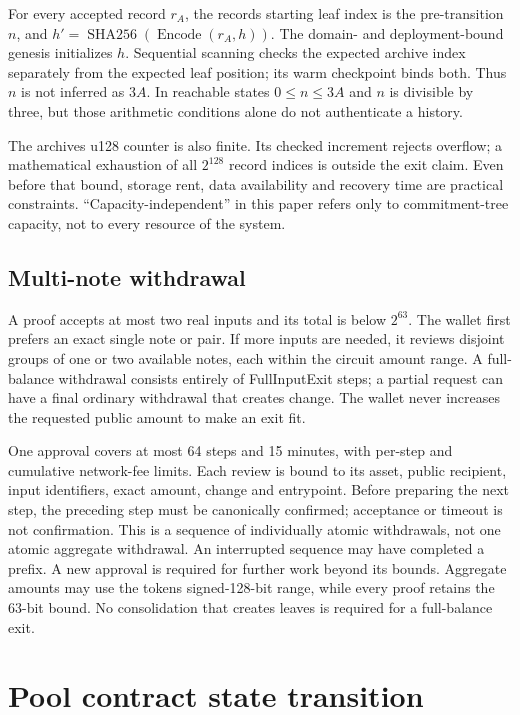 \documentclass[11pt,letterpaper]{article}
\begin{document}
For every accepted record \(r_A\), the record\textquotesingle s starting
leaf index is the pre-transition \(n\), and
\(h'=\operatorname{SHA256}(\operatorname{Encode}(r_A,h))\). The domain-
and deployment-bound genesis initializes \(h\). Sequential scanning
checks the expected archive index separately from the expected leaf
position; its warm checkpoint binds both. Thus \(n\) is not inferred as
\(3A\). In reachable states \(0 \leq n \leq 3A\) and \(n\) is divisible
by three, but those arithmetic conditions alone do not authenticate a
history.

The archive\textquotesingle s u128 counter is also finite. Its checked
increment rejects overflow; a mathematical exhaustion of all \(2^{128}\)
record indices is outside the exit claim. Even before that bound,
storage rent, data availability and recovery time are practical
constraints. ``Capacity-independent'' in this paper refers only to
commitment-tree capacity, not to every resource of the system.

\subsection{Multi-note withdrawal}\label{multi-note-withdrawal}

A proof accepts at most two real inputs and its total is below
\(2^{63}\). The wallet first prefers an exact single note or pair. If
more inputs are needed, it reviews disjoint groups of one or two
available notes, each within the circuit amount range. A full-balance
withdrawal consists entirely of FullInputExit steps; a partial request
can have a final ordinary withdrawal that creates change. The wallet
never increases the requested public amount to make an exit fit.

One approval covers at most 64 steps and 15 minutes, with per-step and
cumulative network-fee limits. Each review is bound to its asset, public
recipient, input identifiers, exact amount, change and entrypoint.
Before preparing the next step, the preceding step must be canonically
confirmed; acceptance or timeout is not confirmation. This is a sequence
of individually atomic withdrawals, not one atomic aggregate withdrawal.
An interrupted sequence may have completed a prefix. A new approval is
required for further work beyond its bounds. Aggregate amounts may use
the token\textquotesingle s signed-128-bit range, while every proof
retains the 63-bit bound. No consolidation that creates leaves is
required for a full-balance exit.

\section{Pool contract state
transition}\label{pool-contract-state-transition}
\end{document}
